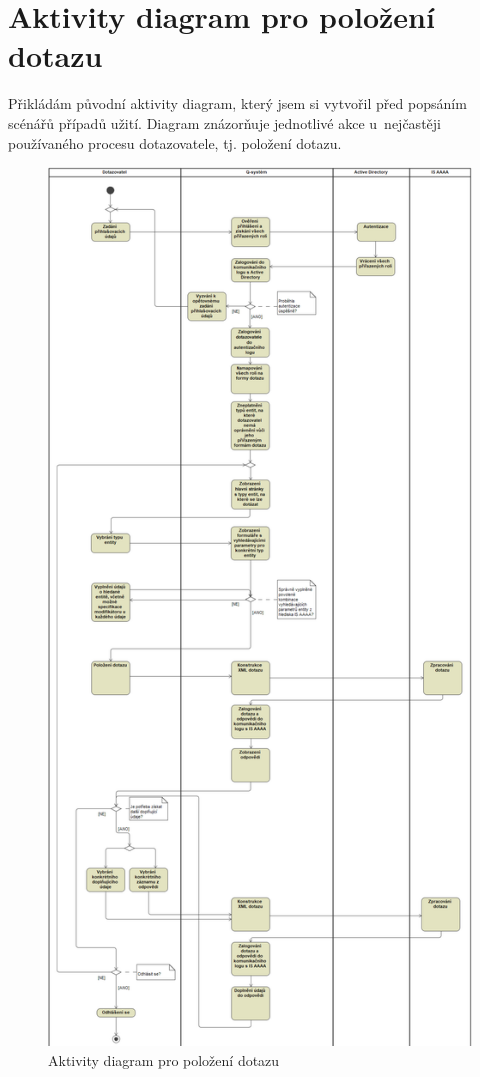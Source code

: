 \documentclass[thesis=M,czech]{FITthesis}[2019/12/23]
\begin{document}
\chapter{Aktivity diagram pro položení dotazu}
Přikládám původní aktivity diagram, který jsem si vytvořil před popsáním scénářů případů užití. Diagram znázorňuje jednotlivé akce u~nejčastěji používaného procesu dotazovatele, tj. položení dotazu.

\begin{figure}[h]
  \centering
  \includegraphics[scale=0.29]{res/design/Activity diagram Položení dotazu.png}
  \caption{Aktivity diagram pro položení dotazu}
  \label{fig:Aktivity diagram pro položení dotazu}
\end{figure}
\end{document}
